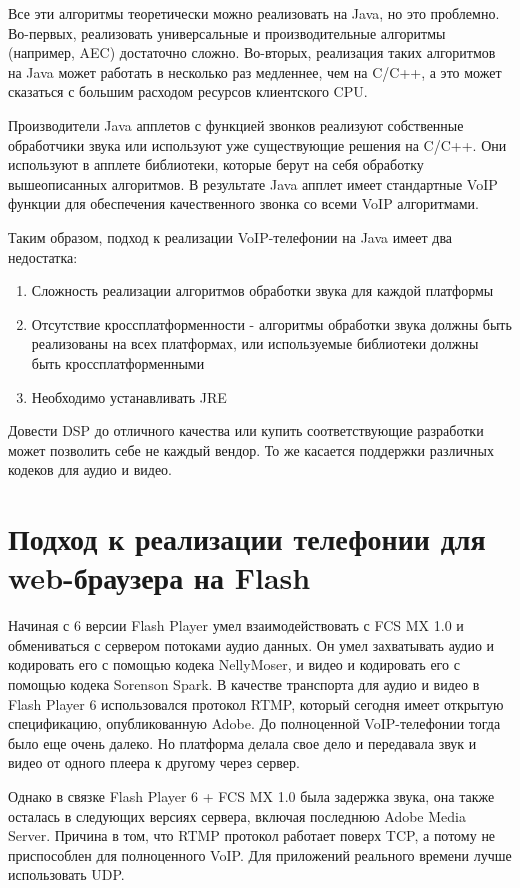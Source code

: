 Все эти алгоритмы теоретически можно реализовать на Java, но это проблемно. Во-первых, реализовать универсальные и производительные алгоритмы (например, AEC) достаточно сложно. Во-вторых, реализация таких алгоритмов на Java может работать в несколько раз медленнее, чем на C/C++, а это может сказаться с большим расходом ресурсов клиентского CPU.

Производители Java апплетов с функцией звонков реализуют собственные обработчики звука или используют уже существующие решения на C/C++. Они используют в апплете библиотеки, которые берут на себя обработку вышеописанных алгоритмов. В результате Java апплет имеет стандартные VoIP функции для обеспечения качественного звонка со всеми VoIP алгоритмами.

Таким образом, подход к реализации VoIP-телефонии на Java имеет два недостатка:
\begin{enumerate}
\item Сложность реализации алгоритмов обработки звука для каждой платформы
\item Отсутствие кроссплатформенности - алгоритмы обработки звука должны быть реализованы на всех платформах, или используемые библиотеки должны быть кроссплатформенными
\item Необходимо устанавливать JRE
\end{enumerate}

Довести DSP до отличного качества или купить соответствующие разработки может позволить себе не каждый вендор. То же касается поддержки различных кодеков для аудио и видео.

\section{Подход к реализации телефонии для web-браузера на Flash}

Начиная с 6 версии Flash Player умел взаимодействовать с FCS MX 1.0 и обмениваться с сервером потоками аудио данных.
Он умел захватывать аудио и кодировать его с помощью кодека NellyMoser, и видео и кодировать его с помощью кодека Sorenson Spark.
В качестве транспорта для аудио и видео в Flash Player 6 использовался протокол RTMP, который сегодня имеет открытую спецификацию, опубликованную Adobe. До полноценной VoIP-телефонии тогда было еще очень далеко. Но платформа делала свое дело и передавала звук и видео от одного плеера к другому через сервер.

Однако в связке Flash Player 6 + FCS MX 1.0 была задержка звука, она также осталась в следующих версиях сервера, включая последнюю Adobe Media Server. Причина в том, что RTMP протокол работает поверх TCP, а потому не приспособлен для полноценного VoIP. Для приложений реального времени лучше использовать UDP.

